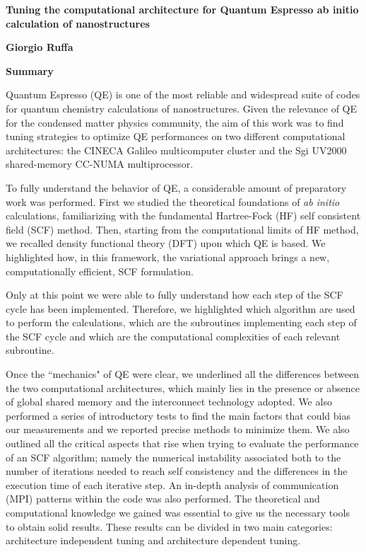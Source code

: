 \documentclass[a4paper,10pt]{article}
\begin{document}
\thispagestyle{plain}
\begin{center}
	\vspace*{-4cm}
    \Large
    \textbf{ Tuning the computational architecture for Quantum Espresso ab initio calculation of nanostructures }
    
    \vspace{0.4cm}
    \textbf{Giorgio Ruffa}
    
    \vspace{0.2cm}
    \textbf{Summary}
\end{center}

Quantum Espresso (QE) is one of the most reliable and widespread  suite of codes for quantum chemistry calculations of nanostructures\cite{QE}. 
Given the relevance of QE for the condensed matter physics community, the aim of this work was to find tuning strategies to optimize QE performances on two different computational architectures: 
the CINECA Galileo multicomputer cluster and the Sgi UV2000 shared-memory CC-NUMA multiprocessor.

To fully understand the behavior of QE, a considerable amount of preparatory work was performed.
First we studied the theoretical foundations of \textit{ab initio} calculations, familiarizing with the fundamental Hartree-Fock (HF) self consistent field (SCF) method\cite{Attila}.
Then, starting from the computational limits of HF method, we recalled density functional theory (DFT)\cite{Parr} upon which QE is based.
We highlighted how, in this framework, the variational approach brings a new, computationally efficient, SCF formulation\cite{Martin}.

Only at this point we were able to fully understand how each step of the SCF cycle has been implemented\cite{Marx}.
Therefore, we highlighted which algorithm are used to perform the calculations, which are the subroutines implementing each step of the SCF cycle and which are the computational complexities of each relevant subroutine.


Once the ``mechanics" of QE were clear, we underlined all the differences between the two computational architectures, which mainly lies in the presence or absence of global shared memory and the interconnect technology adopted\cite{Tanenbaum}.
We also performed a series of introductory tests to find the main factors that could bias our measurements and we reported precise methods to minimize them. 
We also outlined all the critical aspects that rise when trying to evaluate the performance of an SCF algorithm; namely the numerical instability associated both to the number of iterations needed to reach self consistency and the differences in the execution time of each iterative step.
An in-depth analysis of communication (MPI) patterns within the code was also performed.
The theoretical and computational knowledge we gained was essential to give us the necessary tools to obtain solid results. 
These results can be divided in two main categories: architecture independent tuning and architecture dependent tuning.
\end{document}
